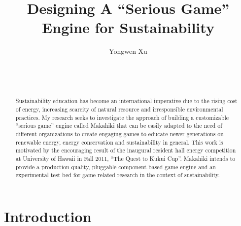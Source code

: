 \documentclass{acm_proc_article-sp}
\begin{document}
\title{Designing A ``Serious Game'' Engine for Sustainability}


\author{
\smallskip
Yongwen Xu\\ 
       \\
       \\
       \\
}

\maketitle
\begin{abstract}
Sustainability education has become an international imperative due to the rising cost of energy, increasing scarcity of natural resource and irresponsible environmental practices. My research seeks to investigate the approach of building a customizable ``serious game'' engine called Makahiki that can be easily adapted to the need of different organizations to create engaging games to educate newer generations on renewable energy, energy conservation and sustainability in general. This work is motivated by the encouraging result of the inaugural resident hall energy competition at University of Hawaii in Fall 2011, ``The Quest to Kukui Cup''. Makahiki intends to provide a production quality, pluggable component-based game engine and an experimental test bed for game related research in the context of sustainability.
  
\end{abstract}




\section{Introduction}
\end{document}
